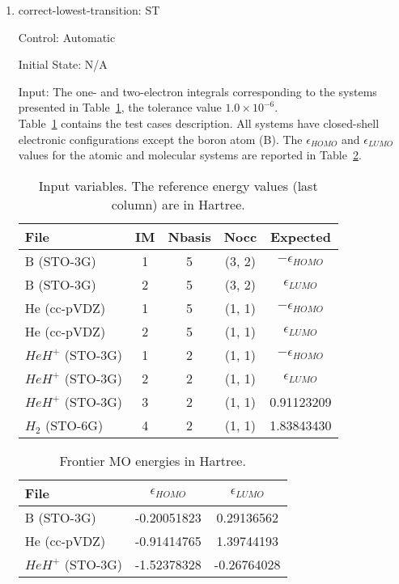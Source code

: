 \documentclass[12pt, titlepage]{article}
\newcounter{systnum} %
\begin{document}
\begin{enumerate}
	
	\item{correct-lowest-transition: ST\thesystnum 
	\label{ST3}\\}
	
	Control: Automatic
	
	Initial State: N/A
	
	Input: The one- and two-electron integrals corresponding to the systems 
	presented in Table~\ref{table:energies}, the tolerance value $1.0 \times 
	10^{-6}$.\\
	
	Table~\ref{table:energies} contains the test cases 
	description. All systems have closed-shell electronic configurations except 
	the boron atom (B). The $\epsilon_{HOMO}$ and 
	$\epsilon_{LUMO}$ values for the atomic and molecular systems are reported 
	in Table~\ref{table:koopman}.

	\begin{table}[h!]
		\centering
		\begin{tabular}{l c c c c}
			\toprule
			\textbf{File} & IM &\textbf{Nbasis} & \textbf{Nocc}& 
			\textbf{Expected}\\
			\midrule
			B (STO-3G) & 1 & 5& (3, 2)& $-\epsilon_{HOMO}$\\
			B (STO-3G) & 2 & 5& (3, 2)& $\epsilon_{LUMO}$\\
			He (cc-pVDZ)& 1& 5& (1, 1)& $-\epsilon_{HOMO}$\\
			He (cc-pVDZ)& 2& 5& (1, 1)& $\epsilon_{LUMO}$\\
			$HeH^{+}$ (STO-3G)& 1 & 2& (1, 1)& $-\epsilon_{HOMO}$\\
			$HeH^{+}$ (STO-3G)& 2 & 2& (1, 1)& $\epsilon_{LUMO}$\\
			$HeH^{+}$ (STO-3G)& 3 & 2& (1, 1)& 0.91123209\\
			$H_2$ (STO-6G)& 4 & 2& (1, 1)& 1.83843430\\			
		\end{tabular}
		\caption{Input variables. The reference energy values (last column) are 
		in Hartree.}
		\label{table:energies}
	\end{table}

	\begin{table}[h!]
		\centering
		\begin{tabular}{l c c}
			\toprule
			\textbf{File} & $\epsilon_{HOMO}$ & $\epsilon_{LUMO}$\\
			\midrule
			B (STO-3G) &-0.20051823& 0.29136562\\
			He (cc-pVDZ)& -0.91414765& 1.39744193\\
			$HeH^{+}$ (STO-3G)& -1.52378328 & -0.26764028\\		
		\end{tabular}
		\caption{Frontier MO energies in Hartree.}
		\label{table:koopman}
	\end{table}
	

\end{enumerate}
\end{document}
